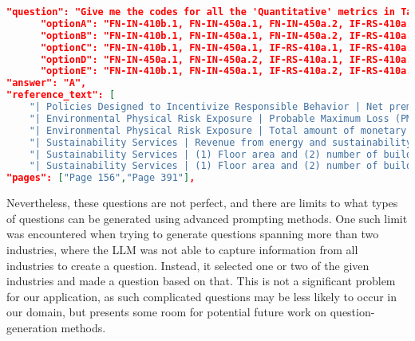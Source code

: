 \begin{lstlisting}[language=JSON,firstnumber=1,label={lst:few_example1},caption={Question Example 2: Cross-industry multi-hop MCQ}]
"question": "Give me the codes for all the 'Quantitative' metrics in Table 1 for Insurance and Real Estate Services industries.",
      "optionA": "FN-IN-410b.1, FN-IN-450a.1, FN-IN-450a.2, IF-RS-410a.1, IF-RS-410a.2, IF-RS-410a.3",
      "optionB": "FN-IN-410b.1, FN-IN-450a.1, FN-IN-450a.2, IF-RS-410a.1",
      "optionC": "FN-IN-410b.1, FN-IN-450a.1, IF-RS-410a.1, IF-RS-410a.2",
      "optionD": "FN-IN-450a.1, FN-IN-450a.2, IF-RS-410a.1, IF-RS-410a.3",
      "optionE": "FN-IN-410b.1, FN-IN-450a.1, IF-RS-410a.2, IF-RS-410a.3",
"answer": "A",
"reference_text": [
    "| Policies Designed to Incentivize Responsible Behavior | Net premiums written related to energy efficiency and low carbon technology | Quantitative | Reporting currency | FN-IN-410b.1 |",
    "| Environmental Physical Risk Exposure | Probable Maximum Loss (PML) of insured products from weather-related natural catastrophes 21 | Quantitative | Reporting currency | FN-IN-450a.1 |",
    "| Environmental Physical Risk Exposure | Total amount of monetary losses attributable to insurance payouts from (1) modeled natural catastrophes and (2) non-modeled natural catastrophes, by type of event and geographic segment (net and gross of reinsurance) 22 | Quantitative | Reporting currency | FN-IN-450a.2 |",
    "| Sustainability Services | Revenue from energy and sustainability services 55 | Quantitative | Reporting currency | IF-RS-410a.1 |",
    "| Sustainability Services | (1) Floor area and (2) number of buildings under management provided with energy and sustainability services | Quantitative | Square feet (ft\u00b2), Number | IF-RS-410a.2 |",
    "| Sustainability Services | (1) Floor area and (2) number of buildings under management that obtained an energy rating | Quantitative | Square feet (ft\u00b2), Number | IF-RS-410a.3 |"],
"pages": ["Page 156","Page 391"],
\end{lstlisting}




Nevertheless, these questions are not perfect, and there are limits to what types of questions can be generated using advanced prompting methods. One such limit was encountered when trying to generate questions spanning more than two industries, where the LLM was not able to capture information from all industries to create a question. Instead, it selected one or two of the given industries and made a question based on that. This is not a significant problem for our application, as such complicated questions may be less likely to occur in our domain, but presents some room for potential future work on question-generation methods.


